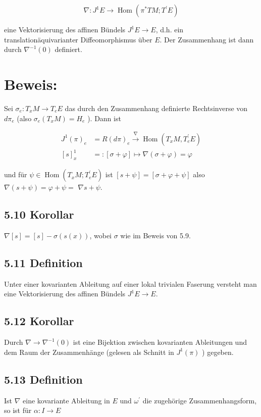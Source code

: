 $$
\nabla: J^{1} E \rightarrow \operatorname{Hom}\left(\pi^{*} T M ; T^{\prime} E\right)
$$

eine Vektorisierung des affinen Bündels $J^{1} E \rightarrow E$, d.h. ein translationäquivarianter Diffeomorphismus über $E$. Der Zusammenhang ist dann durch $\nabla^{-1}(0)$ definiert.

\section*{Beweis:}
Sei $\sigma_{e}: T_{x} M \rightarrow T_{e} E$ das durch den Zusammenhang definierte Rechtsinverse von $d \pi_{e}$ (also $\sigma_{e}\left(T_{x} M\right)=H_{e}$ ). Dann ist

$$
\begin{aligned}
J^{1}(\pi)_{e} & =R(d \pi)_{e} \xrightarrow{\nabla} \operatorname{Hom}\left(T_{x} M, T_{e}^{\prime} E\right) \\
{[s]_{x}^{1} } & =:[\sigma+\varphi] \mapsto \nabla(\sigma+\varphi)=\varphi
\end{aligned}
$$

und für $\psi \in \operatorname{Hom}\left(T_{x} M ; T_{e}^{\prime} E\right)$ ist $[s+\psi]=[\sigma+\varphi+\psi]$ also $\nabla(s+\psi)=\varphi+\psi=$ $\nabla s+\psi$.

\subsection*{5.10 Korollar}
$\nabla[s]=[s]-\sigma(s(x))$, wobei $\sigma$ wie im Beweis von 5.9.

\subsection*{5.11 Definition}
Unter einer kovarianten Ableitung auf einer lokal trivialen Faserung versteht man eine Vektorisierung des affinen Bündels $J^{1} E \rightarrow E$.

\subsection*{5.12 Korollar}
Durch $\nabla \rightarrow \nabla^{-1}(0)$ ist eine Bijektion zwischen kovarianten Ableitungen und dem Raum der Zusammenhänge (gelesen als Schnitt in $J^{1}(\pi)$ ) gegeben.

\subsection*{5.13 Definition}
Ist $\nabla$ eine kovariante Ableitung in $E$ und $\omega^{\prime}$ die zugehörige Zusammenhangsform, so ist für $\alpha: I \rightarrow E$

